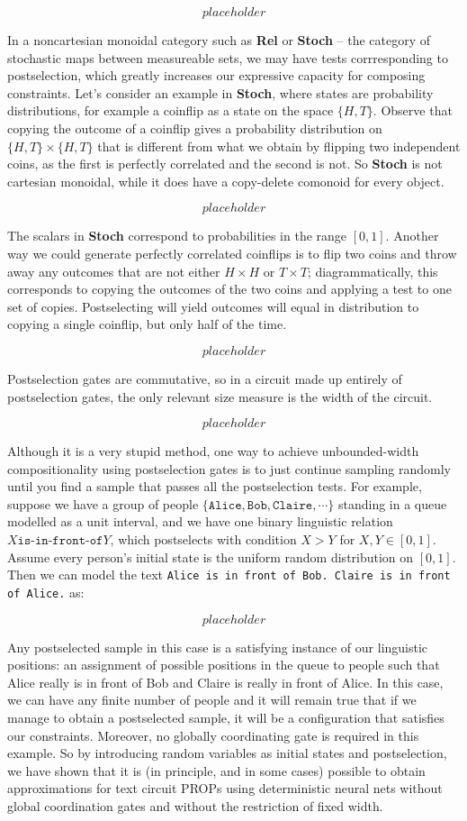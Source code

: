 \begin{fullwidth}
\[placeholder\]

In a noncartesian monoidal category such as \textbf{Rel} or \textbf{Stoch} -- the category of stochastic maps between measureable sets, we may have tests corrresponding to postselection, which greatly increases our expressive capacity for composing constraints. Let's consider an example in \textbf{Stoch}, where states are probability distributions, for example a coinflip as a state on the space $\{H,T\}$. Observe that copying the outcome of a coinflip gives a probability distribution on $\{H,T\} \times \{H,T\}$ that is different from what we obtain by flipping two independent coins, as the first is perfectly correlated and the second is not. So \textbf{Stoch} is not cartesian monoidal, while it does have a copy-delete comonoid for every object.

\[placeholder\]

The scalars in \textbf{Stoch} correspond to probabilities in the range $[0,1]$. Another way we could generate perfectly correlated coinflips is to flip two coins and throw away any outcomes that are not either $H \times H$ or $T \times T$; diagrammatically, this corresponds to copying the outcomes of the two coins and applying a test to one set of copies. Postselecting will yield outcomes will equal in distribution to copying a single coinflip, but only half of the time.

\[placeholder\]

Postselection gates are commutative, so in a circuit made up entirely of postselection gates, the only relevant size measure is the width of the circuit.

\[placeholder\]

Although it is a very stupid method, one way to achieve unbounded-width compositionality using postselection gates is to just continue sampling randomly until you find a sample that passes all the postselection tests. For example, suppose we have a group of people $\{\texttt{Alice}, \texttt{Bob}, \texttt{Claire}, \cdots\}$ standing in a queue modelled as a unit interval, and we have one binary linguistic relation $X \texttt{is-in-front-of} Y$, which postselects with condition $X > Y$ for $X,Y \in [0,1]$. Assume every person's initial state is the uniform random distribution on $[0,1]$. Then we can model the text \texttt{Alice is in front of Bob. Claire is in front of Alice.} as:

\[placeholder\]

Any postselected sample in this case is a satisfying instance of our linguistic positions: an assignment of possible positions in the queue to people such that Alice really is in front of Bob and Claire is really in front of Alice. In this case, we can have any finite number of people and it will remain true that if we manage to obtain a postselected sample, it will be a configuration that satisfies our constraints. Moreover, no globally coordinating gate is required in this example. So by introducing random variables as initial states and postselection, we have shown that it is (in principle, and in some cases) possible to obtain approximations for text circuit PROPs using deterministic neural nets without global coordination gates and without the restriction of fixed width.


\end{fullwidth}
